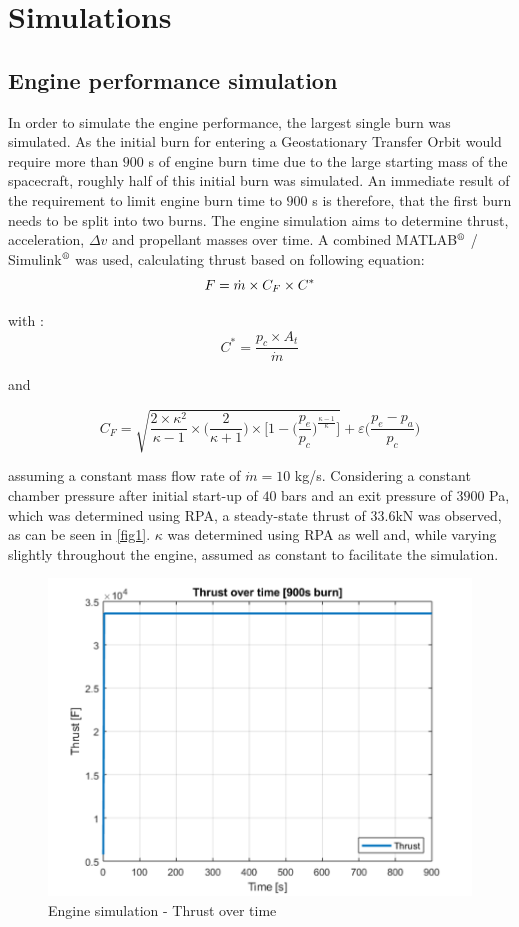 \chapter{Simulations}
\label{chap:11}
\section{Engine performance simulation}
\qquad In order to simulate the engine performance, the largest single burn was simulated. As the initial burn for entering a Geostationary Transfer Orbit would require more than $900$ s of engine burn time due to the large starting mass of the spacecraft, roughly half of this initial burn was simulated. An immediate result of the requirement to limit engine burn time to $900$ s is therefore, that the first burn needs to be split into two burns. The engine simulation aims to determine thrust, acceleration, $\Delta v$ and propellant masses over time. A combined MATLAB$^{\mbox{\scriptsize{\textregistered}}}$  / Simulink$^{\mbox{\scriptsize{\textregistered}}}$  was used, calculating thrust based on following equation:
\begin{equation}
	F = \dot m \times C_F \times C^*\\
\end{equation}

with : 
$$
C^* = \frac{p_c\times A_t}{\dot{m}}
$$

and

$$
C_F = \sqrt{\frac{2\times \kappa^2}{\kappa - 1}\times \bigg(\frac{2}{\kappa + 1}\bigg)\times\bigg[1 - \bigg(\frac{p_e}{p_c}\bigg)^{\frac{\kappa - 1}{\kappa}}\bigg]} + \varepsilon\bigg(\frac{p_e-p_a}{p_c}\bigg)
$$

assuming a constant mass flow rate of $\dot{m} = 10$ kg/s. Considering a constant chamber pressure after initial start-up of $40$ bars and an exit pressure of $3900$ Pa, which was determined using RPA, a steady-state thrust of $33.6$kN was observed, as can be seen in \autoref{fig1}. $\kappa$ was determined using RPA as well and, while varying slightly throughout the engine, assumed as constant to facilitate the simulation.

\begin{figure}[H]
	\centering\includegraphics[width=0.9\linewidth]{thrusttime}
	\caption{Engine simulation - Thrust over time}\label{fig1}
\end{figure}

